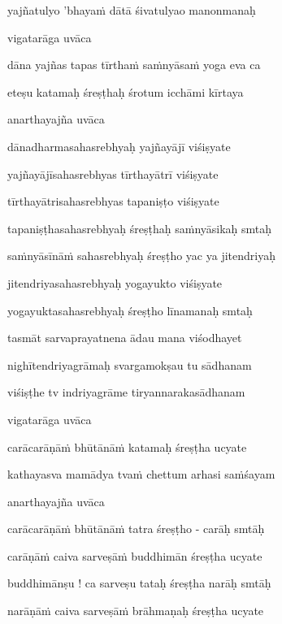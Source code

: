 yajñatulyo 'bhayaṁ dātā śivatulyao manonmanaḥ \veg\dontdisplaylinenum

vigatarāga uvāca~{\dandab}\dontdisplaylinenum 

dāna yajñas tapas tīrthaṁ saṁnyāsaṁ yoga eva ca\thinspace{\danda} \dontdisplaylinenum

eteṣu katamaḥ śreṣṭhaḥ śrotum icchāmi kīrtaya \veg\dontdisplaylinenum

anarthayajña uvāca~{\dandab}\dontdisplaylinenum 

dānadharmasahasrebhyaḥ yajñayājī viśiṣyate\thinspace{\danda} \dontdisplaylinenum

yajñayājīsahasrebhyas tīrthayātrī viśiṣyate \veg\dontdisplaylinenum

tīrthayātrisahasrebhyas tapaniṣṭo viśiṣyate\thinspace{\dandab} \dontdisplaylinenum

tapaniṣṭhasahasrebhyaḥ śreṣṭhaḥ saṁnyāsikaḥ smtaḥ \veg\dontdisplaylinenum

saṁnyāsīnāṁ sahasrebhyaḥ śreṣṭho yac ya jitendriyaḥ\thinspace{\dandab} \dontdisplaylinenum

jitendriyasahasrebhyaḥ yogayukto viśiṣyate \veg\dontdisplaylinenum

yogayuktasahasrebhyaḥ śreṣṭho līnamanaḥ smtaḥ\thinspace{\dandab} \dontdisplaylinenum

tasmāt sarvaprayatnena ādau mana viśodhayet \veg\dontdisplaylinenum

nighītendriyagrāmaḥ svargamokṣau tu sādhanam\thinspace{\dandab} \dontdisplaylinenum

viśiṣṭhe tv indriyagrāme tiryannarakasādhanam \veg\dontdisplaylinenum

vigatarāga uvāca~{\dandab}\dontdisplaylinenum 

carācarāṇāṁ bhūtānāṁ katamaḥ śreṣṭha ucyate\thinspace{\danda} \dontdisplaylinenum

kathayasva mamādya tvaṁ chettum arhasi saṁśayam \veg\dontdisplaylinenum

anarthayajña uvāca~{\dandab}\dontdisplaylinenum 

carācarāṇāṁ bhūtānāṁ tatra śreṣṭho - carāḥ smtāḥ\thinspace{\danda} \dontdisplaylinenum

carāṇāṁ caiva sarveṣāṁ buddhimān śreṣṭha ucyate \veg\dontdisplaylinenum

buddhimānṣu ! ca sarveṣu tataḥ śreṣṭha narāḥ smtāḥ\thinspace{\dandab} \dontdisplaylinenum

narāṇāṁ caiva sarveṣāṁ brāhmaṇaḥ śreṣṭha ucyate \veg\dontdisplaylinenum

